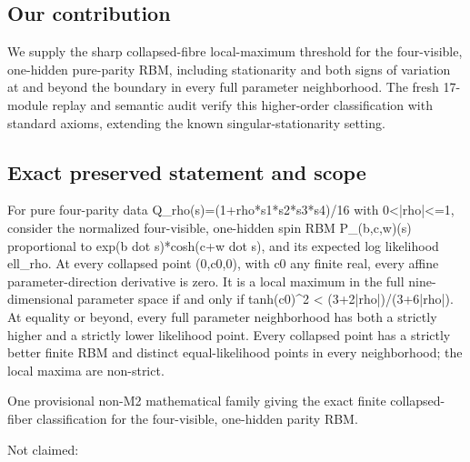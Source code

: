 \documentclass[11pt,a4paper]{article}
\begin{document}
\subsection{Our contribution}
We supply the sharp collapsed-fibre local-maximum threshold for the four-visible, one-hidden pure-parity RBM, including stationarity and both signs of variation at and beyond the boundary in every full parameter neighborhood. The fresh 17-module replay and semantic audit verify this higher-order classification with standard axioms, extending the known singular-stationarity setting.

\subsection{Exact preserved statement and scope}
For pure four-parity data Q\_rho(s)=(1+rho*s1*s2*s3*s4)/16 with 0<|rho|<=1, consider the normalized four-visible, one-hidden spin RBM P\_(b,c,w)(s) proportional to exp(b dot s)*cosh(c+w dot s), and its expected log likelihood ell\_rho. At every collapsed point (0,c0,0), with c0 any finite real, every affine parameter-direction derivative is zero. It is a local maximum in the full nine-dimensional parameter space if and only if tanh(c0)\textasciicircum{}2 < (3+2|rho|)/(3+6|rho|). At equality or beyond, every full parameter neighborhood has both a strictly higher and a strictly lower likelihood point. Every collapsed point has a strictly better finite RBM and distinct equal-likelihood points in every neighborhood; the local maxima are non-strict.

One provisional non-M2 mathematical family giving the exact finite collapsed-fiber classification for the four-visible, one-hidden parity RBM.

Not claimed:
\end{document}
